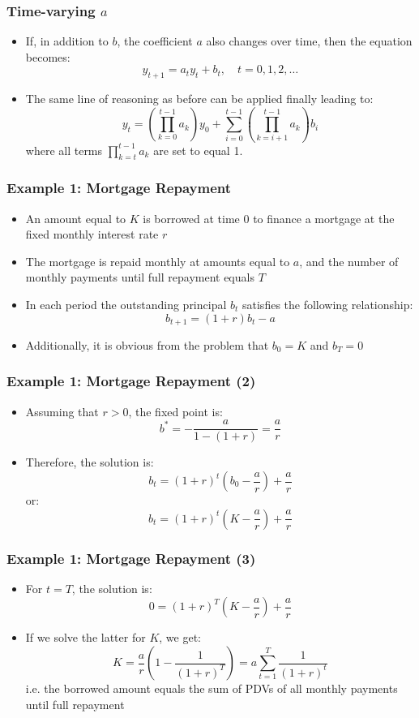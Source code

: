 \documentclass[10pt,usenames,dvipsnames]{beamer}
\theoremstyle{definition}
\begin{document}
\begin{frame}[fragile]
\frametitle{Time-varying $a$}
\begin{itemize}
	\item If, in addition to $b$, the coefficient $a$ also changes over time, then the equation becomes:
	\[
		y_{t+1} = a_{t}y_{t} + b_{t}, \quad t = 0,1,2,\ldots
	\]
	\item The same line of reasoning as before can be applied finally leading to:
	\[
		y_{t} = \left(\prod_{k=0}^{t-1}a_{k}\right)y_{0} + \sum_{i=0}^{t-1}\left(\prod_{k=i+1}^{t-1}a_{k}\right)b_{i}
	\]
	where all terms $\displaystyle \prod_{k=t}^{t-1}a_{k}$ are set to equal 1.
\end{itemize}
\end{frame}

\begin{frame}[fragile]
\frametitle{Example 1: Mortgage Repayment}
\begin{itemize}
	\item An amount equal to $K$ is borrowed at time 0 to finance a mortgage at the fixed monthly interest rate $r$
	\item The mortgage is repaid monthly at amounts equal to $a$, and the number of monthly payments until full repayment equals $T$
	\item In each period the outstanding principal $b_{t}$ satisfies the following relationship:
	\[
		b_{t+1} = (1+r)b_{t} - a
	\]
	\item Additionally, it is obvious from the problem that $b_{0} = K$ and $b_{T} = 0$ 
\end{itemize}
\end{frame}

\begin{frame}[fragile]
\frametitle{Example 1: Mortgage Repayment (2)}
\begin{itemize}
	\item Assuming that $r > 0$, the fixed point is:
	\[
		b^{*} = -\frac{a}{1 - (1+r)} = \frac{a}{r}
	\]
	\item Therefore, the solution is:
	\[
		b_{t} = (1+r)^{t}\left(b_{0} - \frac{a}{r}\right) + \frac{a}{r}
	\]
	or:
	\[
		b_{t} = (1+r)^{t}\left(K - \frac{a}{r}\right) + \frac{a}{r}
	\]
\end{itemize}
\end{frame}

\begin{frame}[fragile]
\frametitle{Example 1: Mortgage Repayment (3)}
\begin{itemize}
	\item For $t=T$, the solution is:
	\[
		0 = (1+r)^{T}\left(K - \frac{a}{r}\right) + \frac{a}{r}
	\]
	\item If we solve the latter for $K$, we get:
	\[
		K = \frac{a}{r}\left(1 - \frac{1}{(1+r)^{T}}\right) = a\sum_{t=1}^{T}\frac{1}{(1+r)^{t}}
	\]
	i.e. the borrowed amount equals the sum of PDVs of all monthly payments until full repayment
\end{itemize}
\end{frame}
\end{document}
